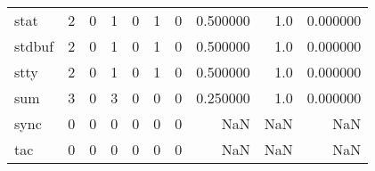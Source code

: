 \begin{longtable}{lrrrrrrrrr}
stat      &                                                  2 &                                                  0 &                                                  1 &                                                  0 &                                                  1 &                                                  0 &                                           0.500000 &                                    1.0 &                             0.000000 \\
stdbuf    &                                                  2 &                                                  0 &                                                  1 &                                                  0 &                                                  1 &                                                  0 &                                           0.500000 &                                    1.0 &                             0.000000 \\
stty      &                                                  2 &                                                  0 &                                                  1 &                                                  0 &                                                  1 &                                                  0 &                                           0.500000 &                                    1.0 &                             0.000000 \\
sum       &                                                  3 &                                                  0 &                                                  3 &                                                  0 &                                                  0 &                                                  0 &                                           0.250000 &                                    1.0 &                             0.000000 \\
sync      &                                                  0 &                                                  0 &                                                  0 &                                                  0 &                                                  0 &                                                  0 &                                                NaN &                                    NaN &                                  NaN \\
tac       &                                                  0 &                                                  0 &                                                  0 &                                                  0 &                                                  0 &                                                  0 &                                                NaN &                                    NaN &                                  NaN \\

\end{longtable}
